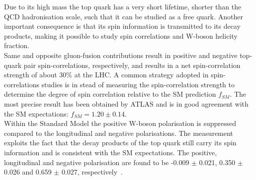 Due to its high mass the top quark has a very short lifetime, shorter than the QCD hadronisation scale, such that it can be studied as a free quark. Another important consequence is that its spin information is transmitted to its decay products, making it possible to study spin correlations and W-boson helicity fraction.
\\
Same and opposite gluon-fusion contributions result in positive and negative top-quark pair spin-correlations, respectively, and results in a net spin-correlation strength of about $30 \%$ at the LHC.
A common strategy adopted in spin-correlations studies is in stead of measuring the spin-correlation strength to determine the degree of spin correlation relative to the SM prediction $f_{SM}$. 
The most precise result has been obtained by ATLAS and is in good agreement with the SM expectations: $f_{SM} = 1.20 \pm 0.14$.
\\
Within the Standard Model the positive W-boson polarisation is suppressed compared to the longitudinal and negative polarisations. 
The measurement exploits the fact that the decay products of the top quark still carry its spin information and is consistent with the SM expectations.
The positive, longitudinal and negative polarisation are found to be -0.009 $\pm$ 0.021, 0.350 $\pm$ 0.026 and 0.659 $\pm$ 0.027, respectively~\cite{CMSWHelicity}.

